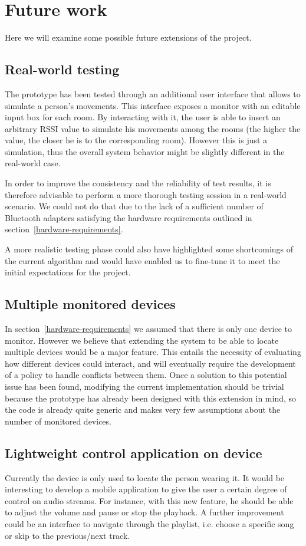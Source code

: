 \documentclass[conference]{IEEEtran}
\begin{document}
\section{Future work}
Here we will examine some possible future extensions of the project.

\subsection{Real-world testing}
The prototype has been tested through an additional user interface that allows to simulate a person's movements. This interface exposes a monitor with an editable input box for each room. By interacting with it, the user is able to insert an arbitrary RSSI value to simulate his movements among the rooms (the higher the value, the closer he is to the corresponding room). However this is just a simulation, thus the overall system behavior might be slightly different in the real-world case.

In order to improve the consistency and the reliability of test results, it is therefore advisable to perform a more thorough testing session in a real-world scenario. We could not do that due to the lack of a sufficient number of Bluetooth adapters satisfying the hardware requirements outlined in section~\ref{hardware-requirements}.

A more realistic testing phase could also have highlighted some shortcomings of the current algorithm and would have enabled us to fine-tune it to meet the initial expectations for the project.

\subsection{Multiple monitored devices}
In section~\ref{hardware-requirements} we assumed that there is only one device to monitor. However we believe that extending the system to be able to locate multiple devices would be a major feature. This entails the necessity of evaluating how different devices could interact, and will eventually require the development of a policy to handle conflicts between them. Once a solution to this potential issue has been found, modifying the current implementation should be trivial because the prototype has already been designed with this extension in mind, so the code is already quite generic and makes very few assumptions about the number of monitored devices.

\subsection{Lightweight control application on device}
Currently the device is only used to locate the person wearing it. It would be interesting to develop a mobile application to give the user a certain degree of control on audio streams. For instance, with this new feature, he should be able to adjust the volume and pause or stop the playback. A further improvement could be an interface to navigate through the playlist, i.e. choose a specific song or skip to the previous/next track.
\end{document}
